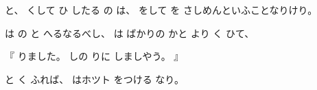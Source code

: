 と、
くして
ひ
したる
の
は、
をして
を
さしめんといふことなりけり。

は
の
と
へるなるべし、
は
ばかりの
かと
より
く
ひて、

『
りました。
しの
りに
しましやう。
』

と
く
ふれば、
はホツト
をつける
なり。
